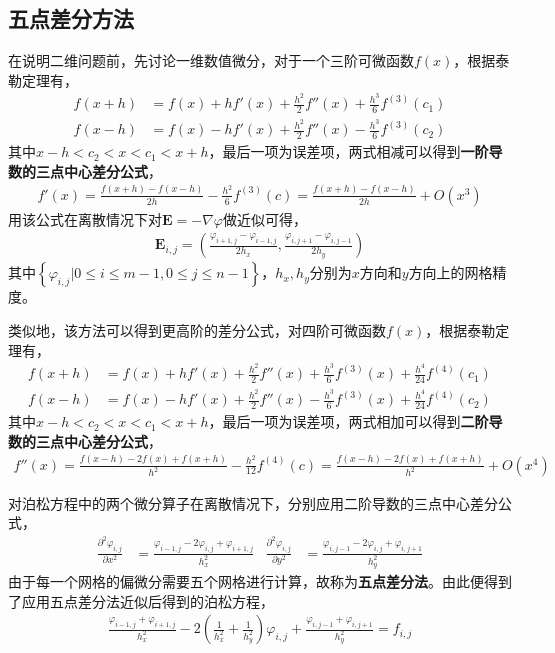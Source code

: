 \documentclass{article} %
\renewcommand{\vec}[1]{\boldsymbol{#1}} %
\begin{document}
\subsection{五点差分方法}
在说明二维问题前，先讨论一维数值微分，对于一个三阶可微函数$f(x)$，根据泰勒定理有，
\begin{align}
    f(x+h) & =f(x)+hf'(x)+\frac{h^2}{2}f''(x)+\frac{h^3}{6}f^{(3)}(c_1) \\
    f(x-h) & =f(x)-hf'(x)+\frac{h^2}{2}f''(x)-\frac{h^3}{6}f^{(3)}(c_2)
\end{align}
其中$x-h<c_2<x<c_1<x+h$，最后一项为误差项，两式相减可以得到\textbf{一阶导数的三点中心差分公式}，
\begin{align}
    f'(x)=\frac{f(x+h)-f(x-h)}{2h}-\frac{h^2}{6}f^{(3)}(c)=\frac{f(x+h)-f(x-h)}{2h}+O(x^3)
\end{align}
用该公式在离散情况下对$\vec{E}=-\nabla \varphi$做近似可得，
\begin{align}
    \vec{E}_{i,j}=\left(\frac{\varphi_{i+1,j}-\varphi_{i-1,j}}{2h_x},\frac{\varphi_{i,j+1}-\varphi_{i,j-1}}{2h_y}\right)
\end{align}
其中$\left\{\varphi_{i,j}|0\leq i\leq m-1,0\leq j\leq n-1\right\}$，$h_x,h_y$分别为$x$方向和$y$方向上的网格精度。

类似地，该方法可以得到更高阶的差分公式，对四阶可微函数$f(x)$，根据泰勒定理有，
\begin{align}
    f(x+h) & =f(x)+hf'(x)+\frac{h^2}{2}f''(x)+\frac{h^3}{6}f^{(3)}(x)+\frac{h^4}{24}f^{(4)}(c_1) \\
    f(x-h) & =f(x)-hf'(x)+\frac{h^2}{2}f''(x)-\frac{h^3}{6}f^{(3)}(x)+\frac{h^4}{24}f^{(4)}(c_2)
\end{align}
其中$x-h<c_2<x<c_1<x+h$，最后一项为误差项，两式相加可以得到\textbf{二阶导数的三点中心差分公式}，
\begin{align}
    f''(x)=\frac{f(x-h)-2f(x)+f(x+h)}{h^2}-\frac{h^2}{12}f^{(4)}(c)=\frac{f(x-h)-2f(x)+f(x+h)}{h^2}+O(x^4)
\end{align}

对泊松方程中的两个微分算子在离散情况下，分别应用二阶导数的三点中心差分公式，
\begin{align}
    \frac{\partial^2 \varphi_{i,j}}{\partial x^2} & =\frac{\varphi_{i-1,j}-2\varphi_{i,j}+\varphi_{i+1,j}}{h_x^2} & \frac{\partial^2 \varphi_{i,j}}{\partial y^2} & =\frac{\varphi_{i,j-1}-2\varphi_{i,j}+\varphi_{i,j+1}}{h_y^2}
\end{align}
由于每一个网格的偏微分需要五个网格进行计算，故称为\textbf{五点差分法}。由此便得到了应用五点差分法近似后得到的泊松方程，
\begin{align}
    \frac{\varphi_{i-1,j}+\varphi_{i+1,j}}{h_x^2}-2(\frac{1}{h_x^2}+\frac{1}{h_y^2})\varphi_{i,j}+\frac{\varphi_{i,j-1}+\varphi_{i,j+1}}{h_y^2}=f_{i,j} \label{3.1}
\end{align}
\end{document}
